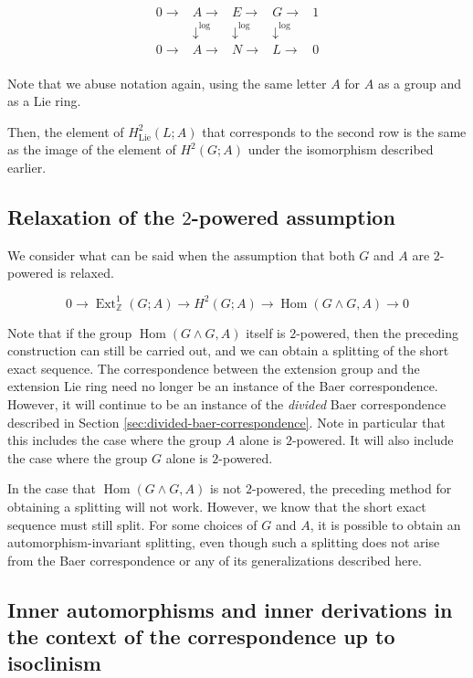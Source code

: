 $$\begin{array}{lllll}
    0 \to & A \to & E \to & G \to & 1 \\
    & \downarrow^{\log} & \downarrow^{\log} & \downarrow^{\log}&  \\
    0  \to & A \to & N \to & L \to & 0\\
\end{array}$$

Note that we abuse notation again, using the same letter $A$ for $A$
as a group and as a Lie ring.

Then, the element of $H^2_{\text{Lie}}(L;A)$ that corresponds to the
second row is the same as the image of the element of $H^2(G;A)$ under
the isomorphism described earlier.

\subsection{Relaxation of the $2$-powered assumption}

We consider what can be said when the assumption that both $G$ and $A$
are $2$-powered is relaxed.

$$0 \to \operatorname{Ext}^1_{\mathbb{Z}}(G;A) \to H^2(G;A) \to \operatorname{Hom}(G \wedge G,A) \to 0$$

Note that if the group $\operatorname{Hom}(G \wedge G,A)$ itself is
$2$-powered, then the preceding construction can still be carried out,
and we can obtain a splitting of the short exact sequence. The
correspondence between the extension group and the extension Lie ring
need no longer be an instance of the Baer correspondence. However, it
will continue to be an instance of the {\em divided} Baer
correspondence described in Section
\ref{sec:divided-baer-correspondence}. Note in particular that this
includes the case where the group $A$ alone is $2$-powered. It will
also include the case where the group $G$ alone is $2$-powered.

In the case that $\operatorname{Hom}(G \wedge G,A)$ is not
$2$-powered, the preceding method for obtaining a splitting will not
work. However, we know that the short exact sequence must still
split. For some choices of $G$ and $A$, it is possible to obtain an
automorphism-invariant splitting, even though such a splitting does
not arise from the Baer correspondence or any of its generalizations
described here.

\subsection{Inner automorphisms and inner derivations in the context of the correspondence up to isoclinism}\label{sec:bcuti-adjoint}

